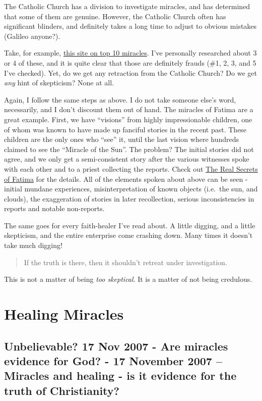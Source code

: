 The Catholic Church has a division to investigate miracles, and has
determined that some of them are genuine. However, the Catholic Church
often has significant blinders, and definitely takes a long time to
adjust to obvious mistakes (Galileo anyone?).

Take, for example,
\href{http://listverse.com/2008/07/14/top-10-astonishing-miracles/}{this
site on top 10 miracles}. I've personally researched about 3 or 4 of
these, and it is quite clear that those are definitely frauds (\#1, 2,
3, and 5 I've checked). Yet, do we get any retraction from the Catholic
Church? Do we get \emph{any} hint of skepticism? None at all.

Again, I follow the same steps as above. I do not take someone else's
word, necessarily, and I don't discount them out of hand. The miracles
of Fatima are a great example. First, we have ``visions'' from highly
impressionable children, one of whom was known to have made up fanciful
stories in the recent past. These children are the only ones who ``see''
it, until the last vision where hundreds claimed to see the ``Miracle of
the Sun''. The problem? The initial stories did not agree, and we only
get a semi-consistent story after the various witnesses spoke with each
other and to a priest collecting the reports. Check out
\href{http://www.csicop.org/si/show/real_secrets_of_fatima/}{The Real
Secrets of Fatima} for the details. All of the elements spoken about
above can be seen - initial mundane experiences, misinterpretation of
known objects (i.e.~the sun, and clouds), the exaggeration of stories in
later recollection, serious inconsistencies in reports and notable
non-reports.

The same goes for every faith-healer I've read about. A little digging,
and a little skepticism, and the entire enterprise come crashing down.
Many times it doesn't take much digging!

\begin{quote}
If the truth is there, then it shouldn't retreat under investigation.
\end{quote}

This is not a matter of being \emph{too skeptical}. It is a matter of
not being credulous.



\section{Healing Miracles}

\subsection{Unbelievable? 17 Nov 2007 - Are miracles evidence for God? -
17 November 2007 -- Miracles and healing - is it evidence for the truth
of
Christianity?}\label{unbelievable-17-nov-2007-are-miracles-evidence-for-god-17-november-2007-miracles-and-healing-is-it-evidence-for-the-truth-of-christianity}


